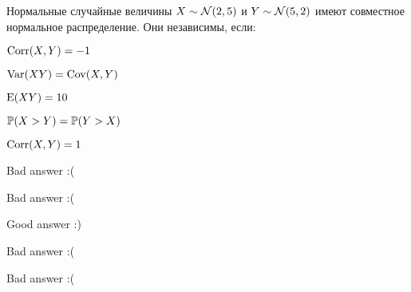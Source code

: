 
\begin{question}
Нормальные случайные величины \(X\sim \cN (2,5)\) и \(Y\sim\cN (5,2)\)
имеют совместное нормальное распределение. Они независимы, если:
\begin{answerlist}
  \item \(\Corr(X,Y)=-1\)
  \item \(\Var(XY)=\Cov(X,Y)\)
  \item \(\E(XY)=10\)
  \item \(\P(X>Y)=\P(Y>X)\)
  \item \(\Corr(X,Y)=1\)
\end{answerlist}
\end{question}

\begin{solution}
\begin{answerlist}
  \item Bad answer :(
  \item Bad answer :(
  \item Good answer :)
  \item Bad answer :(
  \item Bad answer :(
\end{answerlist}
\end{solution}

